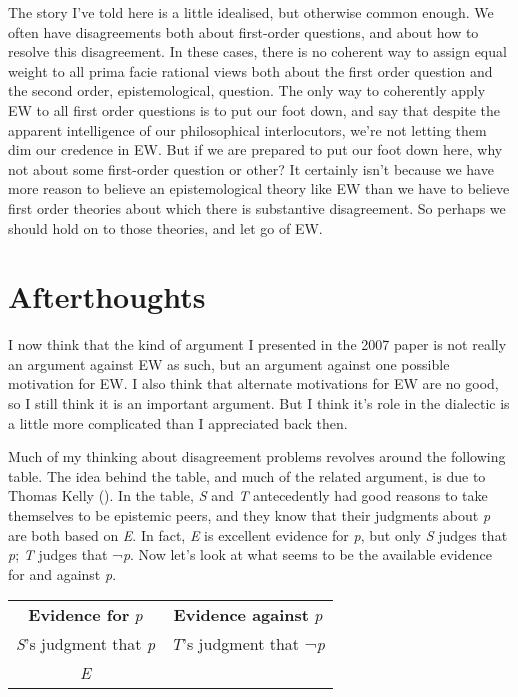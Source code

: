 \documentclass[
  11pt,
  letterpaper,
  DIV=11,
  numbers=noendperiod,
  twoside]{scrartcl}
\begin{document}
The story I've told here is a little idealised, but otherwise common
enough. We often have disagreements both about first-order questions,
and about how to resolve this disagreement. In these cases, there is no
coherent way to assign equal weight to all prima facie rational views
both about the first order question and the second order,
epistemological, question. The only way to coherently apply EW to all
first order questions is to put our foot down, and say that despite the
apparent intelligence of our philosophical interlocutors, we're not
letting them dim our credence in EW. But if we are prepared to put our
foot down here, why not about some first-order question or other? It
certainly isn't because we have more reason to believe an
epistemological theory like EW than we have to believe first order
theories about which there is substantive disagreement. So perhaps we
should hold on to those theories, and let go of EW.

\section*{Afterthoughts}\label{afterthoughts}

I now think that the kind of argument I presented in the 2007 paper is
not really an argument against EW as such, but an argument against one
possible motivation for EW. I also think that alternate motivations for
EW are no good, so I still think it is an important argument. But I
think it's role in the dialectic is a little more complicated than I
appreciated back then.

Much of my thinking about disagreement problems revolves around the
following table. The idea behind the table, and much of the related
argument, is due to Thomas Kelly
(). In the table, \emph{S} and
\emph{T} antecedently had good reasons to take themselves to be
epistemic peers, and they know that their judgments about \emph{p} are
both based on \emph{E}. In fact, \emph{E} is excellent evidence for
\emph{p}, but only \emph{S} judges that \emph{p}; \emph{T} judges that
¬\emph{p}. Now let's look at what seems to be the available evidence for
and against \emph{p}.

\begin{longtable}[]{@{}cc@{}}
\toprule\noalign{}
\endhead
\bottomrule\noalign{}
\endlastfoot
\textbf{Evidence for} \emph{p} & \textbf{Evidence against} \emph{p} \\
\emph{S}'s judgment that \emph{p} & \emph{T}'s judgment that
¬\emph{p} \\
\emph{E} & \\
\end{longtable}
\end{document}
